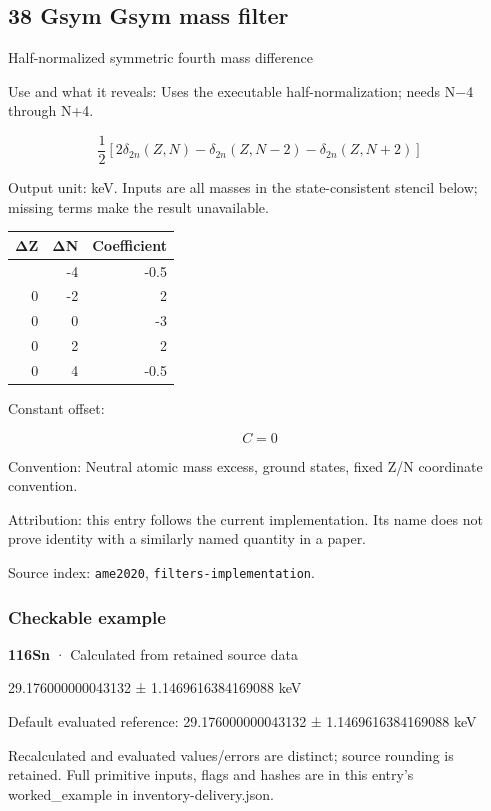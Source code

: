 \documentclass[
  11pt,
  letterpaper,
]{article}
\begin{document}
\subsection{38 Gsym Gsym mass filter}\label{gsym-gsym-mass-filter}

Half-normalized symmetric fourth mass difference

Use and what it reveals: Uses the executable half-normalization; needs
N−4 through N+4.

\[
\frac12[2\delta_{2n}(Z,N)-\delta_{2n}(Z,N-2)-\delta_{2n}(Z,N+2)]
\]

Output unit: keV. Inputs are all masses in the state-consistent stencil
below; missing terms make the result unavailable.

\begin{longtable}[]{@{}rrr@{}}
\toprule\noalign{}
ΔZ & ΔN & Coefficient \\
\midrule\noalign{}
\endhead
\bottomrule\noalign{}
\endlastfoot
0 & -4 & -0.5 \\
0 & -2 & 2 \\
0 & 0 & -3 \\
0 & 2 & 2 \\
0 & 4 & -0.5 \\
\end{longtable}

Constant offset:

\[
C=0
\]

Convention: Neutral atomic mass excess, ground states, fixed Z/N
coordinate convention.

Attribution: this entry follows the current implementation. Its name
does not prove identity with a similarly named quantity in a paper.

Source index: \texttt{ame2020}, \texttt{filters-implementation}.

\subsubsection{Checkable example}\label{checkable-example-37}

\textbf{116Sn} · Calculated from retained source data

29.176000000043132 ± 1.1469616384169088 keV

Default evaluated reference: 29.176000000043132 ± 1.1469616384169088 keV

Recalculated and evaluated values/errors are distinct; source rounding
is retained. Full primitive inputs, flags and hashes are in this entry's
worked\_example in inventory-delivery.json.
\end{document}
